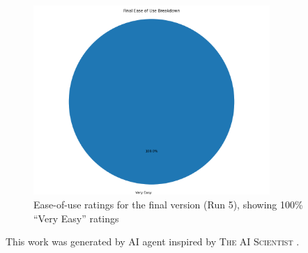 \documentclass{article} %
\begin{document}
\begin{figure}[h]
\centering
\includegraphics[width=0.8\textwidth]{final_ease_of_use_run_5.png}
\caption{Ease-of-use ratings for the final version (Run 5), showing 100\% ``Very Easy'' ratings}
\label{fig:final_ease}
\end{figure}

This work was generated by AI agent inspired by \textsc{The AI Scientist} \citep{lu2024aiscientist}. %



\end{document}
